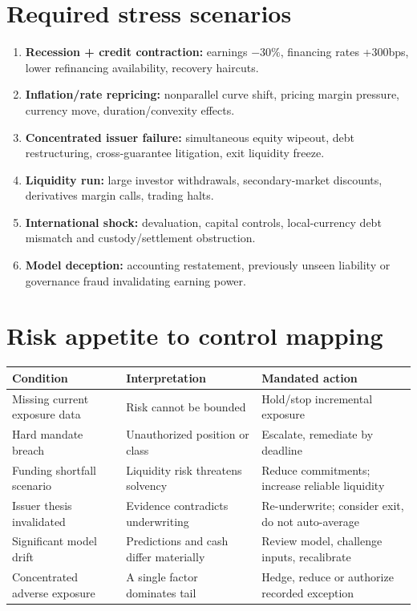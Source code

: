 \documentclass[11pt,letterpaper]{article}
\begin{document}
\section{Required stress scenarios}
\begin{enumerate}
\item \textbf{Recession + credit contraction:} earnings $-30\%$, financing rates +300bps, lower refinancing availability, recovery haircuts.
\item \textbf{Inflation/rate repricing:} nonparallel curve shift, pricing margin pressure, currency move, duration/\allowbreak convexity effects.
\item \textbf{Concentrated issuer failure:} simultaneous equity wipeout, debt restructuring, cross-guarantee litigation, exit liquidity freeze.
\item \textbf{Liquidity run:} large investor withdrawals, secondary-market discounts, derivatives margin calls, trading halts.
\item \textbf{International shock:} devaluation, capital controls, local-currency debt mismatch and custody/\allowbreak settlement obstruction.
\item \textbf{Model deception:} accounting restatement, previously unseen liability or governance fraud invalidating earning power.
\end{enumerate}

\section{Risk appetite to control mapping}
\begin{center}\small\begin{tabularx}{\textwidth}{>{\raggedright\arraybackslash}p{}>{\raggedright\arraybackslash}X >{\raggedright\arraybackslash}X}\toprule Condition & Interpretation & Mandated action \\
\midrule Missing current exposure data & Risk cannot be bounded & Hold/stop incremental exposure \\
Hard mandate breach & Unauthorized position or class & Escalate, remediate by deadline \\
Funding shortfall scenario & Liquidity risk threatens solvency & Reduce commitments; increase reliable liquidity \\
Issuer thesis invalidated & Evidence contradicts underwriting & Re-underwrite; consider exit, do not auto-average \\
Significant model drift & Predictions and cash differ materially & Review model, challenge inputs, recalibrate \\
Concentrated adverse exposure & A single factor dominates tail & Hedge, reduce or authorize recorded exception \\
\bottomrule\end{tabularx}\end{center}
\end{document}
